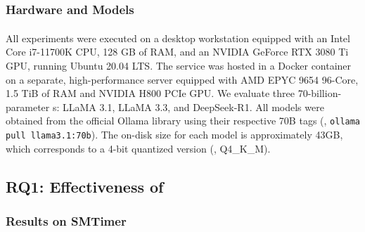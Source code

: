 \subsubsection{Hardware and Models}
All experiments were executed on a desktop workstation equipped with an Intel\textsuperscript{\textregistered} Core\texttrademark{} i7-11700K CPU, 128 GB of RAM, and an NVIDIA GeForce RTX 3080 Ti GPU, running Ubuntu 20.04 LTS. 
The \LLM{} service was hosted in a Docker container on a separate, high-performance server equipped with AMD EPYC 9654 96-Core, 1.5 TiB of RAM and NVIDIA H800 PCIe GPU. 
We evaluate three 70-billion-parameter \LLM{}s: LLaMA 3.1, LLaMA 3.3, and DeepSeek-R1. All models were obtained from the official Ollama library using their respective 70B tags (\eg{}, \texttt{ollama pull llama3.1:70b}). The on-disk size for each model is approximately 43GB, which corresponds to a 4-bit quantized version (\eg{}, Q4\_K\_M). 



\subsection{RQ1: Effectiveness of \tool}
\label{sec:rq1-effectiveness}


\subsubsection{Results on SMTimer}

